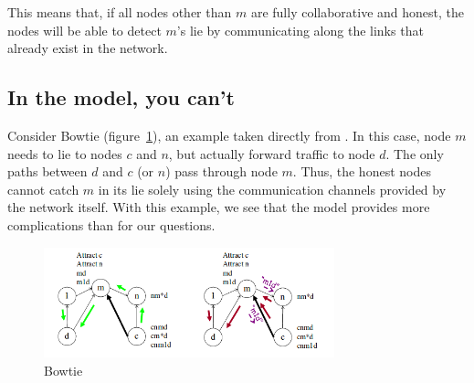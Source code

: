 \documentclass[12pt]{article}
\begin{document}



  This means that, if all nodes other than $m$ are fully collaborative and
  honest, the nodes will be able to detect $m$'s lie
  by communicating along the links that already exist in the network.

  \subsection{In the \cite{Attraction} model, you can't}
    Consider Bowtie (figure~\ref{fig:Bowtie}),
    an example taken directly from \cite{Attraction}.
    In this case, node $m$ needs to lie to nodes $c$ and $n$,
    but actually forward traffic to node $d$.
    The only paths between $d$ and $c$ (or $n$) pass through node $m$.
    Thus, the honest nodes cannot catch $m$ in its lie solely using 
    the communication channels provided by the network itself.
    With this example, we see that the \cite{Attraction} model
    provides more complications than \cite{RoutingGames} for our questions.

    \begin{figure}[h]
      \centering
      \caption{Bowtie}\label{fig:Bowtie}
      \includegraphics[width=0.75\textwidth]{Bowtie}
    \end{figure}
\end{document}
